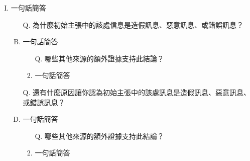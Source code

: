 \documentclass[a4paper, 12pt]{article}
\begin{document}
\begin{enumerate}[I.]
        \item {\color{gray}一句話簡答} %
            \begin{enumerate}[A.]
                \item [Q.]為什麼{\color{blue}初始主張}中的該處信息是造假訊息、惡意訊息、或錯誤訊息？
                \item {\color{gray}一句話簡答} %
                    \begin{enumerate}[1.]
                        \item [Q.]哪些其他來源的額外證據支持此結論？
                        \item {\color{gray}一句話簡答} %
                    \end{enumerate}
                \item [Q.]還有什麼原因讓你認為{\color{blue}初始主張}中的該處訊息是造假訊息、惡意訊息、或錯誤訊息？
                \item {\color{gray}一句話簡答} %
                    \begin{enumerate}[1.]
                        \item [Q.]哪些其他來源的額外證據支持此結論？
                        \item {\color{gray}一句話簡答} %
                    \end{enumerate}
            \end{enumerate}
    \end{enumerate}




\end{document}
